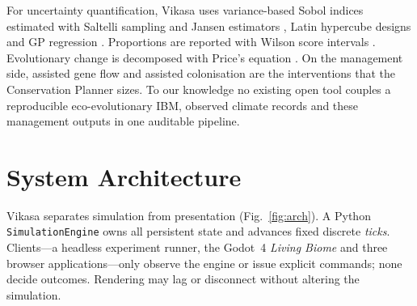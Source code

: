 \documentclass[conference]{IEEEtran}
\begin{document}
For uncertainty quantification, Vikasa uses variance-based Sobol indices
\cite{sobol2001} estimated with Saltelli sampling and Jansen estimators
\cite{saltelli2010,jansen1999}, Latin hypercube designs \cite{mckay1979} and GP
regression \cite{rasmussen2006}. Proportions are reported with Wilson score
intervals \cite{wilson1927}. Evolutionary change is decomposed with Price's
equation \cite{price1970,frank2012}. On the management side, assisted gene flow
\cite{aitken2013} and assisted colonisation \cite{hoegh2008} are the interventions
that the Conservation Planner sizes. To our knowledge no existing open tool couples
a reproducible eco-evolutionary IBM, observed climate records and these
management outputs in one auditable pipeline.

\section{System Architecture}
\label{sec:arch}
Vikasa separates simulation from presentation (Fig.~\ref{fig:arch}). A Python
\texttt{SimulationEngine} owns all persistent state and advances fixed discrete
\emph{ticks}. Clients---a headless experiment runner, the Godot~4
\emph{Living Biome} and three browser applications---only observe the engine
or issue explicit commands; none decide outcomes. Rendering may lag or disconnect
without altering the simulation.
\end{document}
